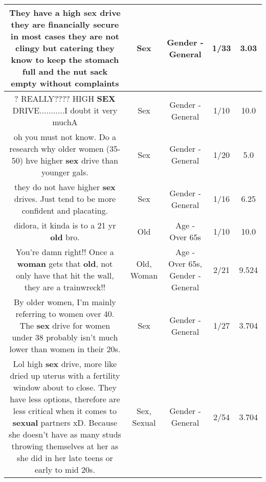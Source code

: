 \documentclass[11pt]{article}
\newlength\mylength
\begin{document}
\begin{center}
\begin{longtable}{|C{.65\mylength}|C{.30\mylength}|C{.12\mylength}|C{.12\mylength}|C{.12\mylength}|}
  \small They have a high \textbf{sex} drive they are financially secure in most cases they are not clingy but catering they know to keep the stomach full and the nut sack empty without complaints\normalsize   & Sex & Gender - General & 1/33 & 3.03 \\  \hline
  \small ? REALLY???? HIGH \textbf{SEX} DRIVE...........I doubt it very muchA\normalsize   & Sex & Gender - General & 1/10 & 10.0 \\  \hline
  \small {} oh you must not know. Do a research why older women (35-50) hve higher \textbf{sex} drive than younger gals.\normalsize   & Sex & Gender - General & 1/20 & 5.0 \\  \hline
  \small {} they do not have higher \textbf{sex} drives. Just tend to be more confident and placating.\normalsize   & Sex & Gender - General & 1/16 & 6.25 \\  \hline
  \small didora, it kinda is to a 21 yr \textbf{old} bro.\normalsize   & Old & Age - Over 65s & 1/10 & 10.0 \\  \hline
  \small {} You're damn right!! Once a \textbf{woman} gets that \textbf{old}, not only have that hit the wall, they are a trainwreck!!\normalsize   & Old, Woman & Age - Over 65s, Gender - General & 2/21 & 9.524 \\  \hline
  \small {} By older women, I'm mainly referring to women over 40. The \textbf{sex} drive for women under 38 probably isn't much lower than women in their 20s.\normalsize   & Sex & Gender - General & 1/27 & 3.704 \\  \hline
  \small Lol high \textbf{sex} drive, more like dried up uterus with a fertility window about to close. They have less options, therefore are less critical when it comes to \textbf{sexual} partners xD. Because she doesn't have as many studs throwing themselves at her as she did in her late teens or early to mid 20s.\normalsize   & Sex, Sexual & Gender - General & 2/54 & 3.704 \\  \hline

\end{longtable}
\end{center}
\end{document}
